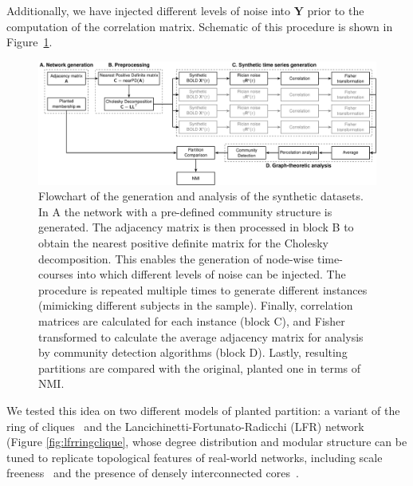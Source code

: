 Additionally, we have injected different levels of noise into $\mathbf{Y}$ prior to the computation of the correlation matrix. 
Schematic of this procedure is shown in Figure~\ref{fig:flowchart}.

\begin{figure}
\centering
\includegraphics[height=0.39\textheight]{images/flowchart.pdf}
\caption{Flowchart of the generation and analysis of the synthetic datasets. In A the network with a pre-defined community structure is generated. The adjacency matrix is then processed in block B to obtain the nearest positive definite matrix for the Cholesky decomposition. This enables the generation of node-wise time-courses into which different levels of noise can be injected. The procedure is repeated multiple times to generate different instances (mimicking different subjects in the sample). Finally, correlation matrices are calculated for each instance (block C), and Fisher transformed to calculate the average adjacency matrix for analysis by community detection algorithms (block D). Lastly, resulting partitions are compared with the original, planted one in terms of NMI.}
\label{fig:flowchart}
\end{figure}

We tested this idea on two different models of planted partition: a variant of the ring of cliques~\cite{fortunato2007} and the Lancichinetti-Fortunato-Radicchi (LFR) network~\cite{lancichinetti2008} (Figure \ref{fig:lfrringclique}, whose degree distribution and modular structure can be tuned to replicate topological features of real-world networks, including scale freeness~\cite{hagmann2008} and the presence of densely interconnected cores~\cite{vandenheuvel2011}.

